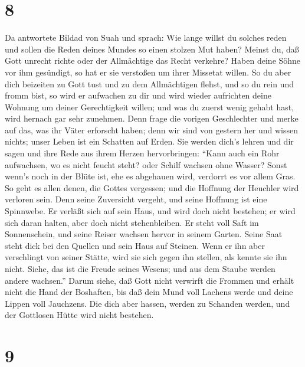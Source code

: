 \hypertarget{section-7}{%
\section{8}\label{section-7}}

 Da antwortete Bildad von Suah und sprach:  Wie
lange willst du solches reden und sollen die Reden deines Mundes so
einen stolzen Mut haben?  Meinst du, daß Gott unrecht richte
oder der Allmächtige das Recht verkehre?  Haben deine Söhne
vor ihm gesündigt, so hat er sie verstoßen um ihrer Missetat willen.
 So du aber dich beizeiten zu Gott tust und zu dem
Allmächtigen flehst,  und so du rein und fromm bist, so wird
er aufwachen zu dir und wird wieder aufrichten deine Wohnung um deiner
Gerechtigkeit willen;  und was du zuerst wenig gehabt hast,
wird hernach gar sehr zunehmen.  Denn frage die vorigen
Geschlechter und merke auf das, was ihr Väter erforscht haben;
 denn wir sind von gestern her und wissen nichts; unser
Leben ist ein Schatten auf Erden.  Sie werden dich's lehren
und dir sagen und ihre Rede aus ihrem Herzen hervorbringen:
 ``Kann auch ein Rohr aufwachsen, wo es nicht feucht steht?
oder Schilf wachsen ohne Wasser?  Sonst wenn's noch in der
Blüte ist, ehe es abgehauen wird, verdorrt es vor allem Gras.
 So geht es allen denen, die Gottes vergessen; und die
Hoffnung der Heuchler wird verloren sein.  Denn seine
Zuversicht vergeht, und seine Hoffnung ist eine Spinnwebe. 
Er verläßt sich auf sein Haus, und wird doch nicht bestehen; er wird
sich daran halten, aber doch nicht stehenbleiben.  Er steht
voll Saft im Sonnenschein, und seine Reiser wachsen hervor in seinem
Garten.  Seine Saat steht dick bei den Quellen und sein
Haus auf Steinen.  Wenn er ihn aber verschlingt von seiner
Stätte, wird sie sich gegen ihn stellen, als kennte sie ihn nicht.
 Siehe, das ist die Freude seines Wesens; und aus dem
Staube werden andere wachsen.''  Darum siehe, daß Gott
nicht verwirft die Frommen und erhält nicht die Hand der Boshaften,
 bis daß dein Mund voll Lachens werde und deine Lippen voll
Jauchzens.  Die dich aber hassen, werden zu Schanden
werden, und der Gottlosen Hütte wird nicht bestehen.

\hypertarget{section-8}{%
\section{9}\label{section-8}}

